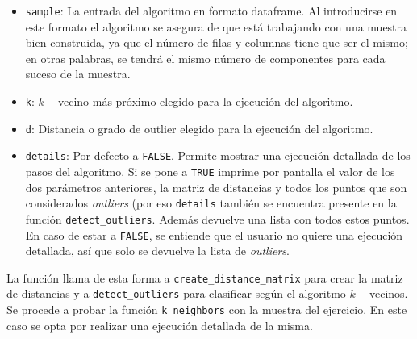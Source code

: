 \documentclass[12pt]{report}\usepackage[]{graphicx}\usepackage[dvipsnames]{xcolor}
\begin{document}
					\begin{itemize}
						\item \texttt{sample}: La entrada del algoritmo en formato dataframe. Al introducirse en este formato el algoritmo se asegura de que está trabajando con una muestra bien construida, ya que el número de filas y columnas tiene que ser el mismo; en otras palabras, se tendrá el mismo número de componentes para cada suceso de la muestra.
						\item \texttt{k}: $k-$vecino más próximo elegido para la ejecución del algoritmo.
						\item \texttt{d}: Distancia o grado de outlier elegido para la ejecución del algoritmo.
						\item \texttt{details}: Por defecto a \texttt{FALSE}. Permite mostrar una ejecución detallada de los pasos del algoritmo. Si se pone a \texttt{TRUE} imprime por pantalla el valor de los dos parámetros anteriores, la matriz de distancias y todos los puntos que son considerados \textit{outliers} (por eso \texttt{details} también se encuentra presente en la función \texttt{detect\_outliers}. Además devuelve una lista con todos estos puntos. En caso de estar a \texttt{FALSE}, se entiende que el usuario no quiere una ejecución detallada, así que solo se devuelve la lista de \textit{outliers}.
					\end{itemize}
					
					La función llama de esta forma a \texttt{create\_distance\_matrix} para crear la matriz de distancias y a \texttt{detect\_outliers} para clasificar según el algoritmo $k-$vecinos.\\
					
					Se procede a probar la función \texttt{k\_neighbors} con la muestra del ejercicio. En este caso se opta por realizar una ejecución detallada de la misma.
					
\end{document}
